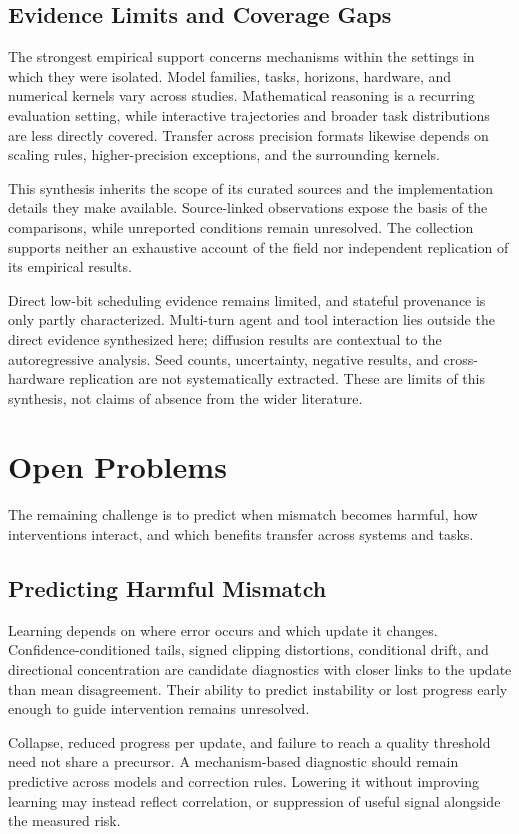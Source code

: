 \subsection{Evidence Limits and Coverage Gaps}
The strongest empirical support concerns mechanisms within the settings in which they were isolated. Model families, tasks, horizons, hardware, and numerical kernels vary across studies. Mathematical reasoning is a recurring evaluation setting, while interactive trajectories and broader task distributions are less directly covered. Transfer across precision formats likewise depends on scaling rules, higher-precision exceptions, and the surrounding kernels.

This synthesis inherits the scope of its curated sources and the implementation details they make available. Source-linked observations expose the basis of the comparisons, while unreported conditions remain unresolved. The collection supports neither an exhaustive account of the field nor independent replication of its empirical results.

Direct low-bit scheduling evidence remains limited, and stateful provenance is only partly characterized. Multi-turn agent and tool interaction lies outside the direct evidence synthesized here; diffusion results are contextual to the autoregressive analysis. Seed counts, uncertainty, negative results, and cross-hardware replication are not systematically extracted. These are limits of this synthesis, not claims of absence from the wider literature.


\section{Open Problems}\label{sec:open}
The remaining challenge is to predict when mismatch becomes harmful, how interventions interact, and which benefits transfer across systems and tasks.

\subsection{Predicting Harmful Mismatch}
Learning depends on where error occurs and which update it changes. Confidence-conditioned tails, signed clipping distortions, conditional drift, and directional concentration are candidate diagnostics with closer links to the update than mean disagreement. Their ability to predict instability or lost progress early enough to guide intervention remains unresolved.

Collapse, reduced progress per update, and failure to reach a quality threshold need not share a precursor. A mechanism-based diagnostic should remain predictive across models and correction rules. Lowering it without improving learning may instead reflect correlation, or suppression of useful signal alongside the measured risk.

